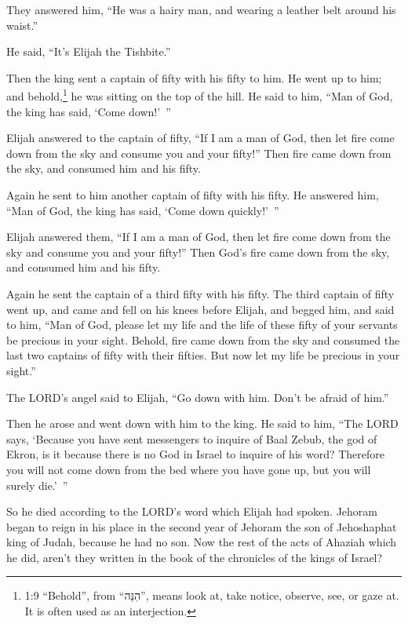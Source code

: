 \myverse{}They answered him, “He was a hairy man, and wearing a leather belt
around his waist.”

He said, “It’s Elijah the Tishbite.”

\myverse{}Then the king sent a captain of fifty with his fifty to him. He
went up to him; and behold,\footnote{1:9 “Behold”, from “הִנֵּה”, means look at, take notice, observe, see, or gaze at. It is
	often used as an interjection.} he was sitting on the top of the hill. He said to him, “Man of
God, the king has said, ‘Come down!’ ”

\myverse{}Elijah answered to the captain of fifty, “If I am a man of God,
then let fire come down from the sky and consume you and your fifty!” Then fire came down from the sky,
and consumed him and his fifty.

\myverse{}Again he sent to him another captain of fifty with his fifty.
He answered him, “Man of God, the king has said, ‘Come down quickly!’ ”

\myverse{}Elijah answered them, “If I am a man of God, then let fire come
down from the sky and consume you and your fifty!” Then God’s fire came down from the sky, and consumed
him and his fifty.

\myverse{}Again he sent the captain of a third fifty with his fifty. The
third captain of fifty went up, and came and fell on his knees before Elijah, and begged him, and said
to him, “Man of God, please let my life and the life of these fifty of your servants be precious in your
sight.
\myverse{}Behold, fire came down from the sky and consumed the last two captains of
fifty with their fifties. But now let my life be precious in your sight.”

\myverse{}The LORD’s angel said to Elijah, “Go down with him. Don’t be
afraid of him.”

Then he arose and went down with him to the king.
\myverse{}He said to him, “The LORD says, ‘Because you have sent messengers to inquire
of Baal Zebub, the god of Ekron, is it because there is no God in Israel to inquire of his word? Therefore
you will not come down from the bed where you have gone up, but you will surely die.’ ”

\myverse{}So he died according to the LORD’s word which Elijah had spoken.
Jehoram began to reign in his place in the second year of Jehoram the son of Jehoshaphat king of Judah,
because he had no son.
\myverse{}Now the rest of the acts of Ahaziah which he did, aren’t they written in the
book of the chronicles of the kings of Israel?


